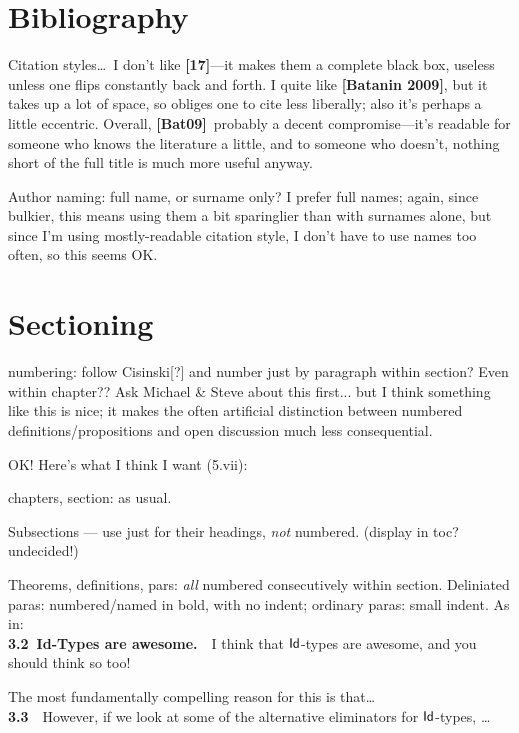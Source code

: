 \documentclass{amsart}
\begin{document}
\section{Bibliography}

Citation styles\ldots\ I don't like \textbf{[17]}---it makes them a complete black box, useless unless one flips constantly back and forth.  I quite like \textbf{[Batanin 2009]}, but it takes up a lot of space, so obliges one to cite less liberally; also it's perhaps a little eccentric.  Overall, \textbf{[Bat09]}\ probably a decent compromise---it's readable for someone who knows the literature a little, and to someone who doesn't, nothing short of the full title is much more useful anyway.

Author naming: full name, or surname only?  I prefer full names; again, since bulkier, this means using them a bit sparinglier than with surnames alone, but since I'm using mostly-readable citation style, I don't have to use names too often, so this seems OK.

\section{Sectioning}  numbering: follow Cisinski[?] and number just by paragraph within section?  Even within chapter??  Ask Michael \& Steve about this first...  but I think something like this is nice; it makes the often artificial distinction between numbered definitions/propositions and open discussion much less consequential.

OK!  Here's what I think I want (5.vii):

chapters, section: as usual.

Subsections --- use just for their headings, \emph{not} numbered.  (display in toc?  undecided!)

Theorems, definitions, pars: \emph{all} numbered consecutively within section.
Deliniated paras: numbered/named in bold, with no indent; ordinary paras: small indent.  As in: \\

\noindent \textbf{3.2\ Id-Types are awesome.}\ \ I think that $\mathsf{Id}$-types are awesome, and you should think so too!

The most fundamentally compelling reason for this is that\ldots \\
  
\noindent \textbf{3.3}\ \ However, if we look at some of the alternative eliminators for $\mathsf{Id}$-types, \ldots \\
\end{document}
